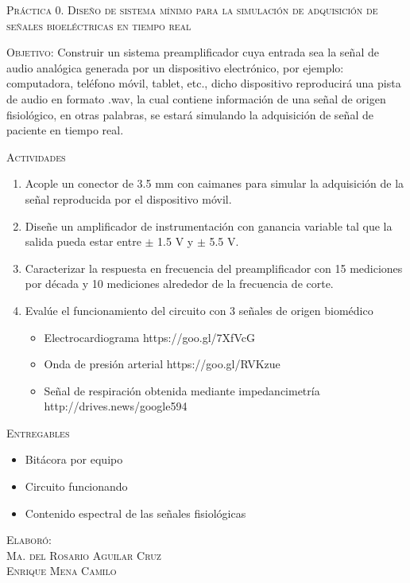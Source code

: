 \documentclass[10pt,letterpaper,spanish,twoside]{report}
\begin{document}
\docdate

\begin{center}
 \textsc{\asignatura}\vspace{.2em}
\end{center}

\textsc{Práctica 0. Diseño de sistema mínimo para la simulación de adquisición de señales bioeléctricas en tiempo real}

\textsc{Objetivo:} Construir un sistema preamplificador cuya entrada sea la señal de audio analógica generada por un dispositivo electrónico, por ejemplo: computadora, teléfono móvil, tablet, etc., dicho dispositivo reproducirá una pista de audio en formato .wav, la cual contiene información de una señal de origen fisiológico, en otras palabras, se estará simulando la adquisición de señal de paciente en tiempo real.

\textsc{Actividades}
\begin{enumerate}
  \item Acople un conector de 3.5 mm con caimanes para simular la adquisición de la señal reproducida por el dispositivo móvil.
  \item Diseñe un amplificador de instrumentación con ganancia variable tal que la salida pueda estar entre $\pm$ 1.5 V y $\pm$ 5.5 V.
  \item Caracterizar la respuesta en frecuencia del preamplificador con 15 mediciones por década y 10 mediciones alrededor de la frecuencia de corte.
  \item Evalúe el funcionamiento del circuito con 3 señales de origen biomédico
  \begin{itemize}
  	\item Electrocardiograma https://goo.gl/7XfVcG
  	\item Onda de presión arterial https://goo.gl/RVKzue
  	\item Señal de respiración obtenida mediante  impedancimetría http://drives.news/google594
  \end{itemize}
\end{enumerate}

\textsc{Entregables}
\begin{itemize}
  \item Bitácora por equipo
  \item Circuito funcionando
  \item Contenido espectral de las señales fisiológicas
\end{itemize}


\vfill
\begin{flushright}
\textsc{Elaboró:\\
Ma. del Rosario Aguilar Cruz\\
Enrique Mena Camilo}
\end{flushright}
\end{document}
